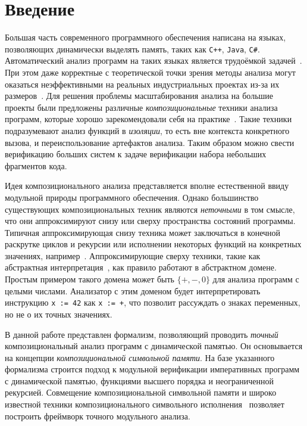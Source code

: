 \section{Введение}

Большая часть современного программного обеспечения написана на языках, позволяющих  динамически выделять память, таких как \texttt{C++}, \texttt{Java}, \texttt{C\#}. Автоматический анализ программ на таких языках является трудоёмкой задачей~\cite{distefano2009attacking}. При этом даже корректные с теоретической точки зрения методы анализа могут оказаться неэффективными на реальных индустриальных проектах из-за их размеров~\cite{calcagno2011compositional}. Для решения проблемы масштабирования анализа на большие проекты были предложены различные \emph{композициональные} техники анализа программ, которые хорошо зарекомендовали себя на практике~\cite{gurfinkel2015seahorn,anand2008demand,distefano2008jstar,calcagno2011infer}. Такие техники подразумевают анализ функций в \emph{изоляции}, то есть вне контекста конкретного вызова, и переиспользование артефактов анализа. Таким образом можно свести верификацию больших систем к задаче верификации набора небольших фрагментов кода.

Идея композиционального анализа представляется вполне естественной ввиду модульной природы программного обеспечения. Однако большинство существующих композициональных техник являются \emph{неточными} в том смысле, что они аппроксимируют снизу или сверху пространства состояний программы. Типичная аппроксимирующая снизу техника может заключаться в конечной раскрутке циклов и рекурсии или исполнении некоторых функций на конкретных значениях, например~\cite{tillmann2008pex}. Аппроксимирующие сверху техники, такие как абстрактная интерпретация~\cite{cousot1977abstract}, как правило работают в абстрактном домене. Простым примером такого домена может быть $\{+, -, 0\}$ для анализа программ с целыми числами. Анализатор с этим доменом будет интерпретировать инструкцию \lstinline{x := 42} как \lstinline{x := +}, что позволит рассуждать о знаках переменных, но не о их точных значениях.

В данной работе представлен формализм, позволяющий проводить \emph{точный} композициональный анализ программ с динамической памятью. Он основывается на концепции \emph{композициональной символьной памяти}. На базе указанного формализма строится подход к модульной верификации императивных программ с динамической памятью, функциями высшего порядка и неограниченной рекурсией. Совмещение композициональной символьной памяти и широко известной техники композиционального символьного исполнения~\cite{godefroid2007compositional} позволяет построить фреймворк точного модульного анализа.

